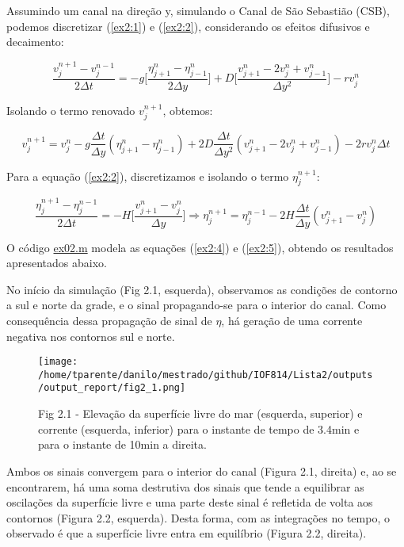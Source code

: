 \documentclass[11pt]{article}
\makeatletter
\def\maxwidth{\ifdim\Gin@nat@width>\linewidth\linewidth
    \else\Gin@nat@width\fi}
\let\Oldincludegraphics\includegraphics
\renewcommand{\includegraphics}[1]{\Oldincludegraphics[width=.8\maxwidth]{#1}}
\makeatother
\begin{document}
Assumindo um canal na direção y, simulando o Canal de São Sebastião
(CSB), podemos discretizar (\ref{ex2:1}) e (\ref{ex2:2}), considerando
os efeitos difusivos e decaimento:

\begin{equation}
    \frac{v^{n+1}_{j} - v^{n-1}_{j}}{2\Delta{t}} = -g\bigg[ \frac{\eta^{n}_{j+1}  - \eta^{n}_{j-1}}{2\Delta{y}} \bigg] + D\bigg[ \frac{v^{n}_{j+1} - 2v^{n}_{j} + v^{n}_{j-1}}{\Delta{y^2}} \bigg] - rv^{n}_{j}
    \label{ex2:3}
\end{equation}
\bigskip

Isolando o termo renovado \(v^{n+1}_{j}\), obtemos:

\begin{equation}
    v^{n+1}_{j} = v^{n}_{j} - g\frac{\Delta{t}}{\Delta{y}}(\eta^{n}_{j+1} - \eta^{n}_{j-1}) + 2D\frac{\Delta{t}}{\Delta{y^2}}(v^{n}_{j+1} - 2v^{n}_{j} + v^{n}_{j-1}) - 2rv^{n}_{j}\Delta{t}
    \label{ex2:4}
\end{equation}

\bigskip
Para a equação (\ref{ex2:2}), discretizamos e isolando o termo
\(\eta^{n+1}_{j}\):

\begin{equation}
    \frac{\eta^{n+1}_{j} - \eta^{n-1}_{j}}{2\Delta{t}} = -H\bigg[ \frac{v^{n}_{j+1} - v^{n}_{j}}{\Delta{y}} \bigg] \Rightarrow \eta^{n+1}_{j} = \eta^{n-1}_{j} - 2H\frac{\Delta{t}}{\Delta{y}}(v^{n}_{j+1} - v^{n}_{j})
    \label{ex2:5}
\end{equation}

O código \href{../codes/ex02.m}{ex02.m} modela as equações (\ref{ex2:4})
e (\ref{ex2:5}), obtendo os resultados apresentados abaixo.
\bigskip

No início da simulação (Fig 2.1, esquerda), observamos as condições
de contorno a sul e norte da grade, e o sinal propagando-se para o
interior do canal. Como consequência dessa propagação de sinal de
\(\eta\), há geração de uma corrente negativa nos contornos sul e norte.


\begin{figure}[!ht]
\centering
\centerline{\hbox{\texttt{[image: /home/tparente/danilo/mestrado/github/IOF814/Lista2/outputs/output\_report/fig2\_1.png]}}}
\caption{Fig 2.1 - Elevação da superfície livre do mar (esquerda, superior) e corrente (esquerda, inferior) para o instante
de tempo de 3.4min e para o instante de 10min a direita.}
\label{fig2:1}
\end{figure}

Ambos os sinais convergem para o interior do canal (Figura 2.1, direita)
e, ao se encontrarem, há uma soma destrutiva dos sinais que tende a
equilibrar as oscilações da superfície livre e uma parte deste sinal é
refletida de volta aos contornos (Figura 2.2, esquerda). Desta forma,
com as integrações no tempo, o observado é que a superfície livre entra
em equilíbrio (Figura 2.2, direita).
\end{document}

